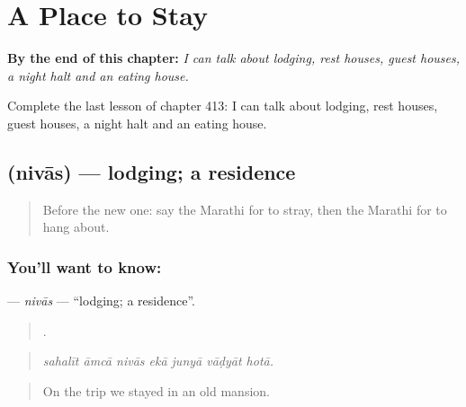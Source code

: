 
\chapter{A Place to Stay}
\label{ch:mr-a-place-to-stay}

\begin{chapteropening}
\textbf{By the end of this chapter:} \emph{I can talk about lodging, rest houses, guest houses, a night halt and an eating house.}

Complete the last lesson of chapter 413: I can talk about lodging, rest houses, guest houses, a night halt and an eating house.
\end{chapteropening}

\section[\texorpdfstring{\mr{निवास} (nivās)}{निवास (nivās)}]{ (nivās) — lodging; a residence}

\label{lesson:MR-C413-nivas}



\begin{quote}
Before the new one: say the Marathi for to stray, then the Marathi for to hang about.
\end{quote}

\subsection*{You'll want to know: }
\textbf{} — \emph{nivās} — \textquotedblleft{}lodging; a residence\textquotedblright{}.

\begin{quote}
      .
\end{quote}

\begin{quote}
\emph{sahalīt āmcā nivās ekā junyā vāḍyāt hotā.}
\end{quote}

\begin{quote}
On the trip we stayed in an old mansion.
\end{quote}

